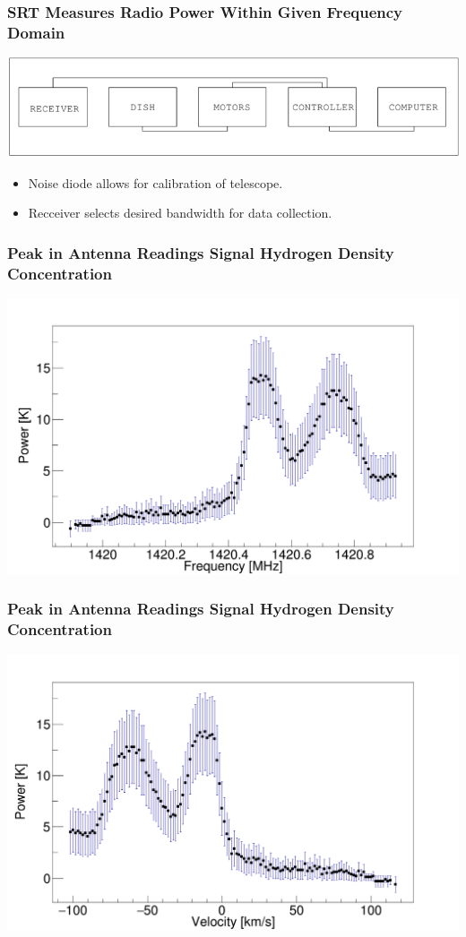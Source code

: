 \documentclass{beamer}
\begin{document}
\begin{frame}
  \frametitle{SRT Measures Radio Power Within Given Frequency Domain}
  \includegraphics[width=1\textwidth]{block}
  \begin{itemize}
    \item Noise diode allows for calibration of telescope.
    \item Recceiver selects desired bandwidth for data collection.
  \end{itemize}
\end{frame}

\begin{frame}
  \frametitle{Peak in Antenna Readings Signal Hydrogen Density Concentration}
  \includegraphics[width=1\textwidth]{data_freq.png}
\end{frame}

\begin{frame}
  \frametitle{Peak in Antenna Readings Signal Hydrogen Density Concentration}
  \includegraphics[width=1\textwidth]{data_vel.png}
\end{frame}
\end{document}
